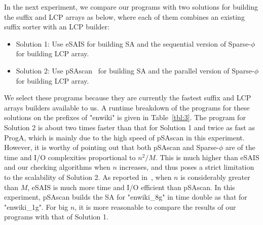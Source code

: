 \documentclass[10pt,journal,compsoc]{IEEEtran}
\begin{document}

In the next experiment, we compare our programs with two solutions for building the suffix and LCP arrays as below, where each of them combines an existing suffix sorter with an LCP builder:


\begin{itemize}
	\item Solution 1: Use eSAIS for building SA and the sequential version of Sparse-$\phi$~\cite{Karkkainen2016} for building LCP array.
	
	\item Solution 2: Use pSAscan~\cite{Karkkainen2015} for building SA and the parallel version of Sparse-$\phi$ for building LCP array.
\end{itemize}


We select these programs because they are currently the fastest suffix and LCP arrays builders available to us. A runtime breakdown of the programs for these solutions on the prefixes of "enwiki" is given in Table~\ref{tbl:3}. The program for Solution 2 is about two times faster than that for Solution 1 and twice as fast as ProgA, which is mainly due to the high speed of pSAscan in this experiment. However, it is worthy of pointing out that both pSAscan and Sparse-$\phi$ are of the time and I/O complexities proportional to $n^2/M$. This is much higher than eSAIS and our checking algorithms when $n$ increases, and thus poses a strict limitation to the scalability of Solution 2. As reported in~\cite{Karkkainen2015}, when $n$ is considerably greater than $M$, eSAIS is much more time and I/O efficient than pSAscan. In this experiment, pSAscan builds the SA for "enwiki\_8g" in time double as that for "enwiki\_1g". For big $n$, it is more reasonable to compare the results of our programs with that of Solution 1.
\end{document}

